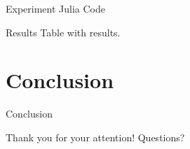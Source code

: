 \documentclass{beamer}
\begin{document}
\begin{frame}{Experiment}
    Julia Code
\end{frame}

\begin{frame}{Results}
    Table with results.
\end{frame}

\section{Conclusion}

\begin{frame}{Conclusion}
    
    \begin{center}
        Thank you for your attention! Questions? 
    \end{center}
\end{frame}
\end{document}
